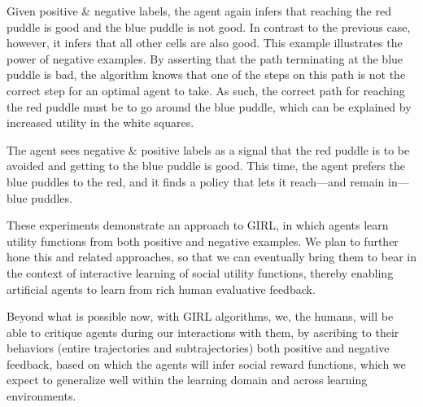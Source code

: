 Given positive \& negative labels, the agent again infers that
reaching the red puddle is good and the blue puddle is not
good. In contrast to the previous case, however, it infers that all
other cells are also good. This example illustrates the power of
negative examples. By asserting that the path terminating at the blue
puddle is bad, the algorithm knows that one of the steps on this path
is not the correct step for an optimal agent to take. As such, the
correct path for reaching the red puddle must be to go around the blue
puddle, which can be explained by increased utility in the white
squares.
\commenta{
}

The agent sees negative \& positive labels as a signal that the red
puddle is to be avoided and getting to the blue puddle is good.  This
time, the agent prefers the blue puddles to the red, and it finds a
policy that lets it reach---and remain in---blue puddles.


These experiments demonstrate an approach to GIRL, in which agents
learn utility functions from both positive and negative examples.
We plan to further hone this and related approaches, so that we can
eventually bring them to bear in the context of interactive learning
of social utility functions, thereby enabling artificial agents to
learn from rich human evaluative feedback.

Beyond what is possible now, with GIRL algorithms, we, the humans,
will be able to critique agents during our interactions with them, by
ascribing to their behaviors (entire trajectories and subtrajectories)
both positive and negative feedback, based on which the agents will
infer social reward functions, which we expect to generalize well
within the learning domain and across learning environments.
